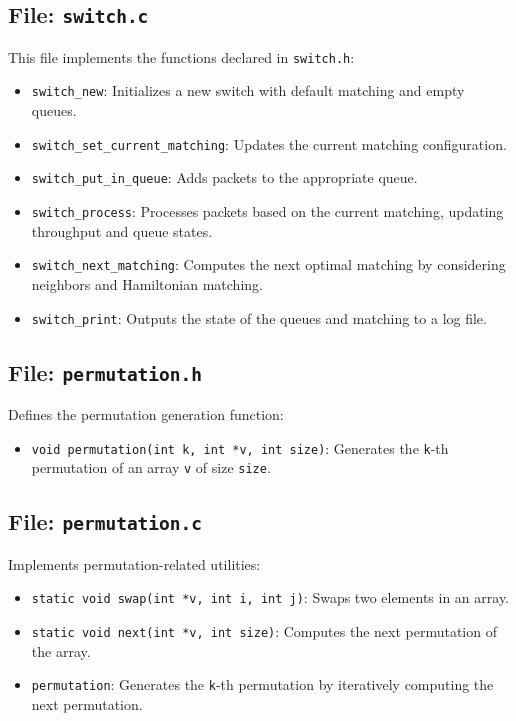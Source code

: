 \documentclass[12pt	]{article}
\begin{document}
\subsection{File: \texttt{switch.c}}
This file implements the functions declared in \texttt{switch.h}:
\begin{itemize}
	\item \texttt{switch\_new}: Initializes a new switch with default matching and empty queues.
	\item \texttt{switch\_set\_current\_matching}: Updates the current matching configuration.
	\item \texttt{switch\_put\_in\_queue}: Adds packets to the appropriate queue.
	\item \texttt{switch\_process}: Processes packets based on the current matching, updating throughput and queue states.
	\item \texttt{switch\_next\_matching}: Computes the next optimal matching by considering neighbors and Hamiltonian matching.
	\item \texttt{switch\_print}: Outputs the state of the queues and matching to a log file.
\end{itemize}

\subsection{File: \texttt{permutation.h}}
Defines the permutation generation function:
\begin{itemize}
	\item \texttt{void permutation(int k, int *v, int size)}: Generates the \texttt{k}-th permutation of an array \texttt{v} of size \texttt{size}.
\end{itemize}

\subsection{File: \texttt{permutation.c}}
Implements permutation-related utilities:
\begin{itemize}
	\item \texttt{static void swap(int *v, int i, int j)}: Swaps two elements in an array.
	\item \texttt{static void next(int *v, int size)}: Computes the next permutation of the array.
	\item \texttt{permutation}: Generates the \texttt{k}-th permutation by iteratively computing the next permutation.
\end{itemize}
\end{document}

